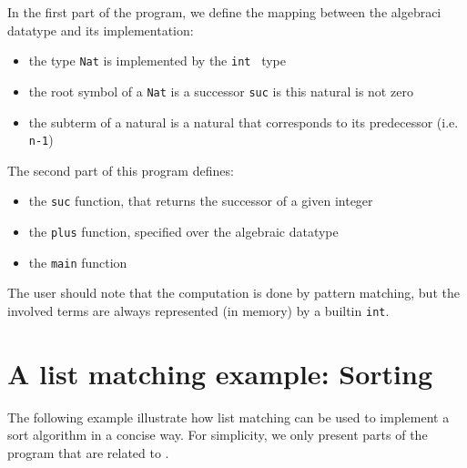 \noindent
In the first part of the program, we define the mapping between the
algebraci datatype and its implementation:
\begin{itemize}
\item the type \texttt{Nat} is implemented by the \texttt{int} \C\
  type 
\item the root symbol of a \texttt{Nat} is a successor \texttt{suc} is
  this natural is not zero
\item the subterm of a natural is a natural that corresponds
  to its predecessor (i.e. \texttt{n-1})
\end{itemize}



\noindent
The second part of this program defines:
\begin{itemize}
\item the \texttt{suc} function, that returns the successor of a given integer
\item the \texttt{plus} function, specified over the algebraic datatype
\item the \texttt{main} function
\end{itemize}
The user should note that the computation is done by pattern matching,
but the involved terms are always represented (in memory) by a builtin
\texttt{int}.



\section{A list matching example: Sorting}
The following example illustrate how list matching can be used to
implement a sort algorithm in a concise way.
For simplicity, we only present parts of the program that are related
to \TOM.

